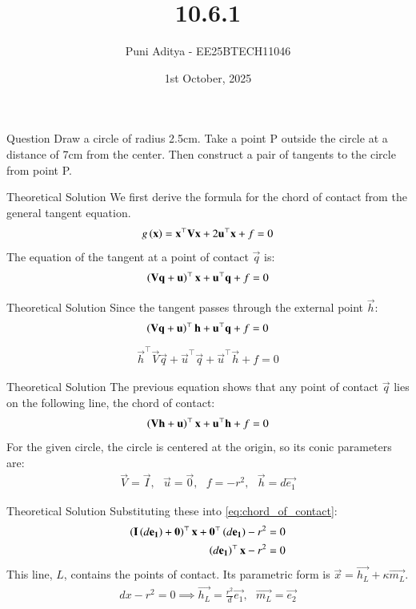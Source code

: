 \documentclass{beamer}
\title{10.6.1}
\date{1st October, 2025}
\author{Puni Aditya - EE25BTECH11046}
\begin{document}
\frame{\titlepage}
\begin{frame}{Question}
Draw a circle of radius 2.5cm. Take a point P outside the circle at a distance of 7cm from the center. Then construct a pair of tangents to the circle from point P.

\end{frame}

\begin{frame}{Theoretical Solution}
We first derive the formula for the chord of contact from the general tangent equation.
\begin{align*}
    g\left(\mathbf{x}\right) = \mathbf{x}^\top\mathbf{V}\mathbf{x} + 2\mathbf{u}^\top\mathbf{x} + f = 0
\end{align*}
The equation of the tangent at a point of contact $\vec{q}$ is:
\begin{align}
    \left(\mathbf{V}\mathbf{q} + \mathbf{u}\right)^\top\mathbf{x} + \mathbf{u}^\top\mathbf{q} + f = 0 \label{eq:tangent}
\end{align}
\end{frame}

\begin{frame}{Theoretical Solution}
Since the tangent passes through the external point $\vec{h}$:
\begin{align}
    \left(\mathbf{V}\mathbf{q} + \mathbf{u}\right)^\top\mathbf{h} + \mathbf{u}^\top\mathbf{q} + f = 0 \label{eq:point_on_tangent}
\end{align}
\begin{align}
    \vec{h}^\top\vec{V}\vec{q} + \vec{u}^\top\vec{q} + \vec{u}^\top\vec{h} + f = 0 \label{eq:rearranged}
\end{align}
\end{frame}

\begin{frame}{Theoretical Solution}
The previous equation shows that any point of contact $\vec{q}$ lies on the following line, the chord of contact:
\begin{align}
    \left(\mathbf{V}\mathbf{h} + \mathbf{u}\right)^\top\mathbf{x} + \mathbf{u}^\top\mathbf{h} + f = 0 \label{eq:chord_of_contact}
\end{align}
For the given circle, the circle is centered at the origin, so its conic parameters are:
\begin{align}
    \vec{V} = \vec{I}, \text{ } \vec{u} = \vec{0}, \text{ } f = -r^2, \text{ } \vec{h} = d\vec{e_1}
\end{align}
\end{frame}

\begin{frame}{Theoretical Solution}
Substituting these into \eqref{eq:chord_of_contact}:
\begin{align}
    \left(\mathbf{I}\left(d\mathbf{e_1}\right) + \mathbf{0}\right)^\top\mathbf{x} + \mathbf{0}^\top\left(d\mathbf{e_1}\right) - r^2 &= 0 \\
    \left(d\mathbf{e_1}\right)^\top\mathbf{x} - r^2 &= 0
\end{align}
This line, $L$, contains the points of contact. Its parametric form is $\vec{x} = \vec{h_L} + \kappa\vec{m_L}$.
\begin{align}
    d x - r^2 = 0 \implies \vec{h_L} = \frac{r^2}{d}\vec{e_1}, \text{ } \vec{m_L} = \vec{e_2}
\end{align}
\end{frame}
\end{document}
